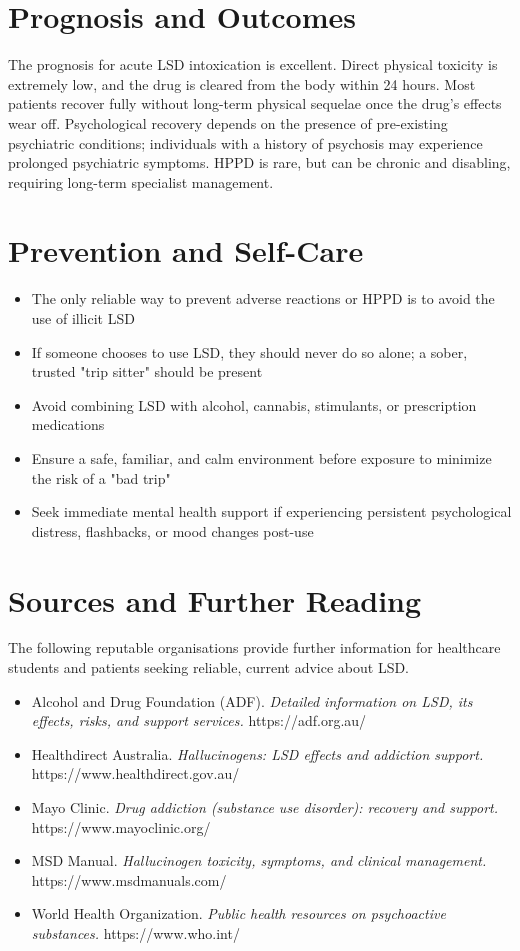 \section*{Prognosis and Outcomes}
The prognosis for acute LSD intoxication is excellent. Direct physical toxicity is extremely low, and the drug is cleared from the body within 24 hours. Most patients recover fully without long-term physical sequelae once the drug's effects wear off. Psychological recovery depends on the presence of pre-existing psychiatric conditions; individuals with a history of psychosis may experience prolonged psychiatric symptoms. HPPD is rare, but can be chronic and disabling, requiring long-term specialist management.

\section*{Prevention and Self-Care}
\begin{itemize}
    \item The only reliable way to prevent adverse reactions or HPPD is to avoid the use of illicit LSD
    \item If someone chooses to use LSD, they should never do so alone; a sober, trusted "trip sitter" should be present
    \item Avoid combining LSD with alcohol, cannabis, stimulants, or prescription medications
    \item Ensure a safe, familiar, and calm environment before exposure to minimize the risk of a "bad trip"
    \item Seek immediate mental health support if experiencing persistent psychological distress, flashbacks, or mood changes post-use
\end{itemize}

\section*{Sources and Further Reading}
The following reputable organisations provide further information for healthcare students and patients seeking reliable, current advice about LSD.

\begin{itemize}
    \item Alcohol and Drug Foundation (ADF). \textit{Detailed information on LSD, its effects, risks, and support services.} https://adf.org.au/
    \item Healthdirect Australia. \textit{Hallucinogens: LSD effects and addiction support.} https://www.healthdirect.gov.au/
    \item Mayo Clinic. \textit{Drug addiction (substance use disorder): recovery and support.} https://www.mayoclinic.org/
    \item MSD Manual. \textit{Hallucinogen toxicity, symptoms, and clinical management.} https://www.msdmanuals.com/
    \item World Health Organization. \textit{Public health resources on psychoactive substances.} https://www.who.int/
\end{itemize}

